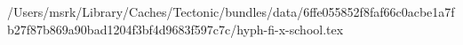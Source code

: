 /Users/msrk/Library/Caches/Tectonic/bundles/data/6ffe055852f8faf66c0acbe1a7fb27f87b869a90bad1204f3bf4d9683f597c7c/hyph-fi-x-school.tex